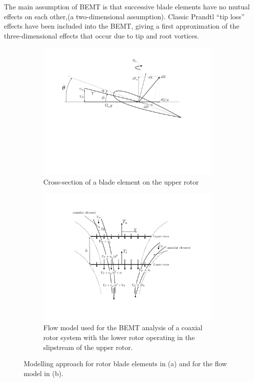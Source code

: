 The main assumption of BEMT is that successive blade elements have no mutual effects on each other,(a two-dimensional assumption). Classic Prandtl “tip loss” effects have been included into the BEMT, giving a first approximation of the three-dimensional effects that occur due to tip and root vortices.


\begin{figure}[H]
\captionsetup[subfigure]{justification=centering}
\begin{subfigure}[t]{0.5\textwidth}
    \centering
    \includegraphics[width=\textwidth]{Figures/blade_axial.pdf}
    \caption{Cross-section of a blade element on the upper rotor}
    \label{fig:blade2d}
\end{subfigure}
\begin{subfigure}[t]{0.5\textwidth}
    \centering
    \includegraphics[width=\textwidth]{Figures/disk2D_BEM_axial.pdf}
    \caption{Flow model used for the BEMT analysis of a coaxial rotor system with the lower rotor operating in the slipstream of the upper rotor. }
    \label{fig:disks}
\end{subfigure}
    \captionsetup{justification=centering}
    \caption{Modelling approach for rotor blade elements in (a) and for the flow model in (b).}
    \label{fig:BEMT}
\end{figure}


